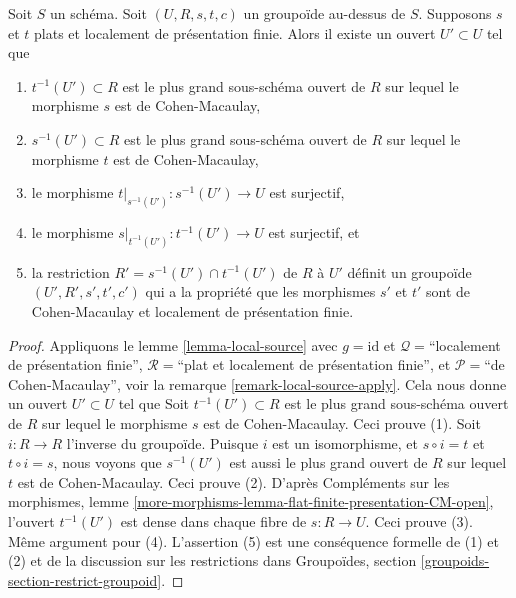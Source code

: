 \begin{lemma}
\label{lemma-make-CM}
Soit $S$ un schéma.
Soit $(U, R, s, t, c)$ un groupoïde au-dessus de $S$.
Supposons $s$ et $t$ plats et localement de présentation finie.
Alors il existe un ouvert $U' \subset U$ tel que
\begin{enumerate}
\item $t^{-1}(U') \subset R$ est le plus grand sous-schéma ouvert de
$R$ sur lequel le morphisme $s$ est de Cohen-Macaulay,
\item $s^{-1}(U') \subset R$ est le plus grand sous-schéma ouvert de
$R$ sur lequel le morphisme $t$ est de Cohen-Macaulay,
\item le morphisme $t|_{s^{-1}(U')} : s^{-1}(U') \to U$ est
surjectif,
\item le morphisme $s|_{t^{-1}(U')} : t^{-1}(U') \to U$ est
surjectif, et
\item la restriction $R' = s^{-1}(U') \cap t^{-1}(U')$
de $R$ à $U'$ définit un groupoïde $(U', R', s', t', c')$ qui a la propriété
que les morphismes $s'$ et $t'$ sont de Cohen-Macaulay et localement de
présentation finie.
\end{enumerate}
\end{lemma}

\begin{proof}
Appliquons le
lemme \ref{lemma-local-source}
avec
$g = \text{id}$ et
$\mathcal{Q} =$``localement de présentation finie'',
$\mathcal{R} =$``plat et localement de présentation finie'', et
$\mathcal{P}=$``de Cohen-Macaulay'', voir
la remarque \ref{remark-local-source-apply}.
Cela nous donne un ouvert $U' \subset U$ tel que
Soit $t^{-1}(U') \subset R$ est le plus grand sous-schéma ouvert de $R$
sur lequel le morphisme $s$ est de Cohen-Macaulay.
Ceci prouve (1).
Soit $i : R \to R$ l'inverse du groupoïde.
Puisque $i$ est un isomorphisme, et $s \circ i = t$ et $t \circ i = s$,
nous voyons que $s^{-1}(U')$ est aussi le plus grand ouvert de $R$ sur lequel $t$ est
de Cohen-Macaulay. Ceci prouve (2).
D'après
Compléments sur les morphismes,
lemme \ref{more-morphisms-lemma-flat-finite-presentation-CM-open},
l'ouvert $t^{-1}(U')$ est dense dans chaque fibre de $s : R \to U$.
Ceci prouve (3). Même argument pour (4).
L'assertion (5) est une conséquence formelle de (1) et (2) et de la discussion
sur les restrictions dans
Groupoïdes, section \ref{groupoids-section-restrict-groupoid}.
\end{proof}








